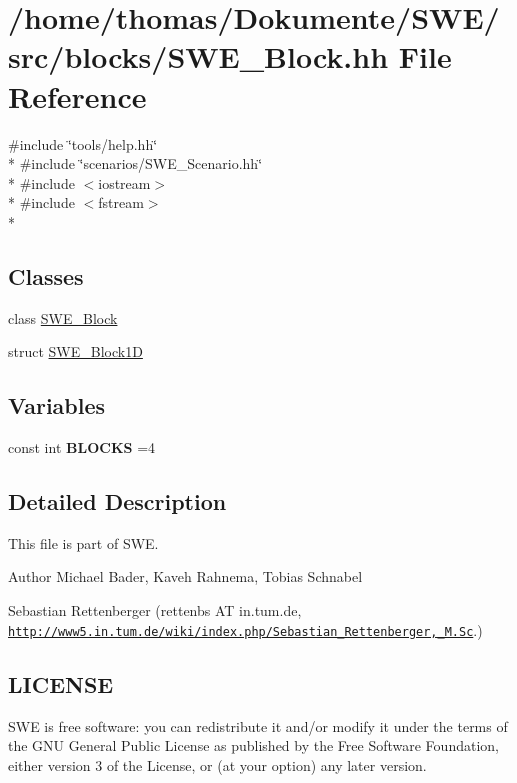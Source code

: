 \hypertarget{SWE__Block_8hh}{\section{/home/thomas/\-Dokumente/\-S\-W\-E/src/blocks/\-S\-W\-E\-\_\-\-Block.hh File Reference}
\label{SWE__Block_8hh}
}
{\ttfamily \#include \char`\"{}tools/help.\-hh\char`\"{}}\\*
{\ttfamily \#include \char`\"{}scenarios/\-S\-W\-E\-\_\-\-Scenario.\-hh\char`\"{}}\\*
{\ttfamily \#include $<$iostream$>$}\\*
{\ttfamily \#include $<$fstream$>$}\\*
\subsection*{Classes}
\begin{DoxyCompactItemize}
\item 
class \hyperlink{classSWE__Block}{S\-W\-E\-\_\-\-Block}
\item 
struct \hyperlink{structSWE__Block1D}{S\-W\-E\-\_\-\-Block1\-D}
\end{DoxyCompactItemize}
\subsection*{Variables}
\begin{DoxyCompactItemize}
\item 
\hypertarget{SWE__Block_8hh_aba27f10a4102f42b651910bb693870a6}{const int {\bfseries B\-L\-O\-C\-K\-S} =4}\label{SWE__Block_8hh_aba27f10a4102f42b651910bb693870a6}

\end{DoxyCompactItemize}


\subsection{Detailed Description}
This file is part of S\-W\-E.

\begin{DoxyAuthor}{Author}
Michael Bader, Kaveh Rahnema, Tobias Schnabel 

Sebastian Rettenberger (rettenbs A\-T in.\-tum.\-de, \href{http://www5.in.tum.de/wiki/index.php/Sebastian_Rettenberger,_M.Sc}{\tt http\-://www5.\-in.\-tum.\-de/wiki/index.\-php/\-Sebastian\-\_\-\-Rettenberger,\-\_\-\-M.\-Sc}.)
\end{DoxyAuthor}
\hypertarget{Writer_8hh_LICENSE}{}\subsection{L\-I\-C\-E\-N\-S\-E}\label{Writer_8hh_LICENSE}
S\-W\-E is free software\-: you can redistribute it and/or modify it under the terms of the G\-N\-U General Public License as published by the Free Software Foundation, either version 3 of the License, or (at your option) any later version.

